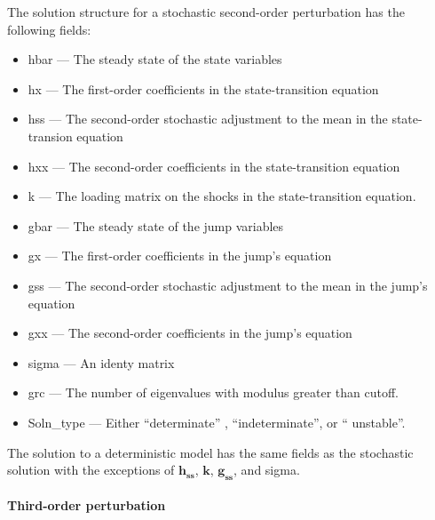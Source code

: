 \documentclass[notitlepage,11pt]{article}
\begin{document}
The solution structure for a stochastic second-order perturbation has the
following fields:

\begin{itemize}
\item hbar --- The steady state of the state variables

\item hx --- The first-order coefficients in the state-transition equation

\item hss --- The second-order stochastic adjustment to the mean in the
state-transion equation

\item hxx --- The second-order coefficients in the state-transition equation

\item k --- The loading matrix on the shocks in the state-transition
equation.

\item gbar --- The steady state of the jump variables

\item gx --- The first-order coefficients in the jump's equation

\item gss --- The second-order stochastic adjustment to the mean in the
jump's equation

\item gxx --- The second-order coefficients in the jump's equation

\item sigma --- An identy matrix

\item grc --- The number of eigenvalues with modulus greater than cutoff.

\item Soln\_type --- Either \textquotedblleft determinate\textquotedblright
, \textquotedblleft indeterminate\textquotedblright , or \textquotedblleft
unstable\textquotedblright .
\end{itemize}

The solution to a deterministic model has the same fields as the stochastic
solution with the exceptions of $\mathbf{h}_{\mathbf{ss}}$, $\mathbf{k}$, $%
\mathbf{g}_{\mathbf{ss}}$, and sigma.

\paragraph{Third-order perturbation}
\end{document}
